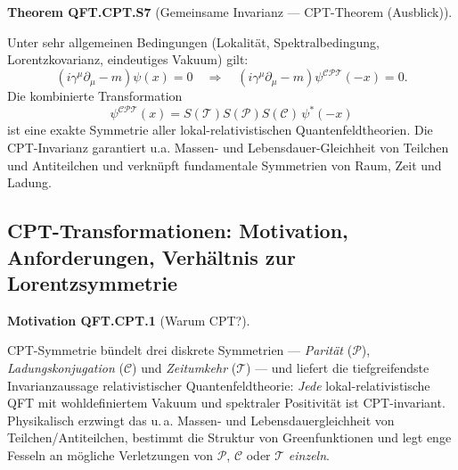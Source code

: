 \documentclass[10pt, letterpaper]{article}
\newcommand{\CustomHeading}[3]{%
  \par\medskip\noindent%
  \textbf{#1 #2} \textnormal{(#3)}.\enskip%
}
\newenvironment{THEO}[2]{\begin{unitbox}\CustomHeading{Theorem}{#1}{#2}}{\end{unitbox}}
\newenvironment{MOT}[2]{\begin{unitbox}\CustomHeading{Motivation}{#1}{#2}}{\end{unitbox}}
\begin{document}
\begin{THEO}{QFT.CPT.S7}{Gemeinsame Invarianz — CPT-Theorem (Ausblick)}
Unter sehr allgemeinen Bedingungen (Lokalität, Spektralbedingung, Lorentzkovarianz, eindeutiges Vakuum) gilt:
\[
\boxed{(i\gamma^\mu\partial_\mu - m)\psi(x)=0
\quad\Longrightarrow\quad
(i\gamma^\mu\partial_\mu - m)\psi^{\mathcal{CPT}}(-x)=0.}
\]
Die kombinierte Transformation
\[
\psi^{\mathcal{CPT}}(x)
= S(\mathcal T)S(\mathcal P)S(\mathcal C)\,\psi^*(-x)
\]
ist eine exakte Symmetrie aller lokal-relativistischen Quantenfeldtheorien.  
Die CPT-Invarianz garantiert u.a. Massen- und Lebensdauer-Gleichheit von Teilchen und Antiteilchen und verknüpft fundamentale Symmetrien von Raum, Zeit und Ladung.
\end{THEO}

\subsection{CPT-Transformationen: Motivation, Anforderungen, Verhältnis zur Lorentzsymmetrie}

\begin{MOT}{QFT.CPT.1}{Warum CPT?}
CPT-Symmetrie bündelt drei diskrete Symmetrien — \emph{Parität} ($\mathcal P$), \emph{Ladungskonjugation} ($\mathcal C$) und \emph{Zeitumkehr} ($\mathcal T$) — und liefert die tiefgreifendste Invarianz­aussage relativistischer Quantenfeldtheorie: \emph{Jede} lokal-relativistische QFT mit wohldefiniertem Vakuum und spektraler Positivität ist CPT-invariant. Physikalisch erzwingt das u.\,a. Massen- und Lebensdauer­gleichheit von Teilchen/Antiteilchen, bestimmt die Struktur von Greenfunktionen und legt enge Fesseln an mögliche Verletzungen von $\mathcal P$, $\mathcal C$ oder $\mathcal T$ \emph{einzeln}.
\end{MOT}
\end{document}
